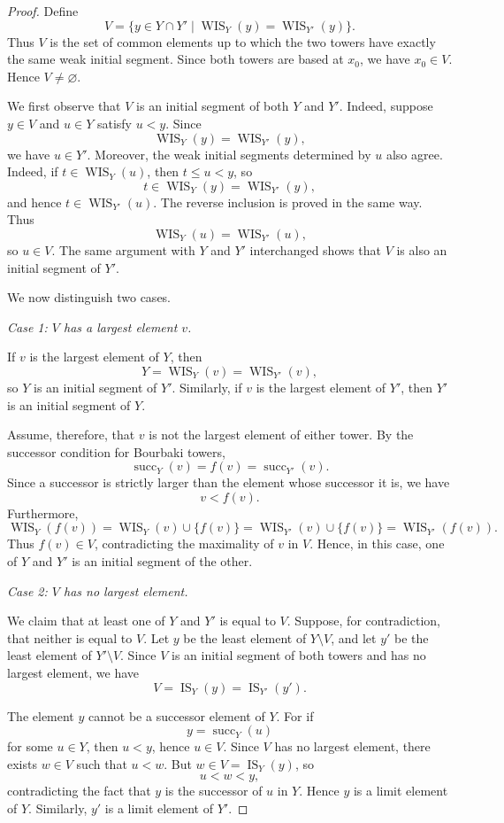 \documentclass[11pt]{article}
\theoremstyle{definition}
\theoremstyle{remark}
\newcommand{\IS}{\operatorname{IS}}
\newcommand{\WIS}{\operatorname{WIS}}
\newcommand{\succop}{\operatorname{succ}}
\begin{document}
\begin{proof}
Define
\[
V=\{y\in Y\cap Y'\mid \WIS_Y(y)=\WIS_{Y'}(y)\}.
\]
Thus \(V\) is the set of common elements up to which the two towers have exactly the
same weak initial segment. Since both towers are based at \(x_0\), we have \(x_0\in V\).
Hence \(V\neq\varnothing\).

We first observe that \(V\) is an initial segment of both \(Y\) and \(Y'\). Indeed, suppose
\(y\in V\) and \(u\in Y\) satisfy \(u<y\). Since
\[
\WIS_Y(y)=\WIS_{Y'}(y),
\]
we have \(u\in Y'\). Moreover, the weak initial segments determined by \(u\) also agree.
Indeed, if \(t\in\WIS_Y(u)\), then \(t\leq u<y\), so
\[
t\in\WIS_Y(y)=\WIS_{Y'}(y),
\]
and hence \(t\in\WIS_{Y'}(u)\). The reverse inclusion is proved in the same way. Thus
\[
\WIS_Y(u)=\WIS_{Y'}(u),
\]
so \(u\in V\). The same argument with \(Y\) and \(Y'\) interchanged shows that \(V\) is
also an initial segment of \(Y'\).

We now distinguish two cases.

\medskip

\noindent
\emph{Case 1: \(V\) has a largest element \(v\).}

If \(v\) is the largest element of \(Y\), then
\[
Y=\WIS_Y(v)=\WIS_{Y'}(v),
\]
so \(Y\) is an initial segment of \(Y'\). Similarly, if \(v\) is the largest element of
\(Y'\), then \(Y'\) is an initial segment of \(Y\).

Assume, therefore, that \(v\) is not the largest element of either tower. By the successor
condition for Bourbaki towers,
\[
\succop_Y(v)=f(v)=\succop_{Y'}(v).
\]
Since a successor is strictly larger than the element whose successor it is, we have
\[
v<f(v).
\]
Furthermore,
\[
\WIS_Y(f(v))
=
\WIS_Y(v)\cup\{f(v)\}
=
\WIS_{Y'}(v)\cup\{f(v)\}
=
\WIS_{Y'}(f(v)).
\]
Thus \(f(v)\in V\), contradicting the maximality of \(v\) in \(V\). Hence, in this case,
one of \(Y\) and \(Y'\) is an initial segment of the other.

\medskip

\noindent
\emph{Case 2: \(V\) has no largest element.}

We claim that at least one of \(Y\) and \(Y'\) is equal to \(V\). Suppose, for
contradiction, that neither is equal to \(V\). Let \(y\) be the least element of
\(Y\setminus V\), and let \(y'\) be the least element of \(Y'\setminus V\). Since \(V\) is
an initial segment of both towers and has no largest element, we have
\[
V=\IS_Y(y)=\IS_{Y'}(y').
\]

The element \(y\) cannot be a successor element of \(Y\). For if
\[
y=\succop_Y(u)
\]
for some \(u\in Y\), then \(u<y\), hence \(u\in V\). Since \(V\) has no largest element,
there exists \(w\in V\) such that \(u<w\). But \(w\in V=\IS_Y(y)\), so
\[
u<w<y,
\]
contradicting the fact that \(y\) is the successor of \(u\) in \(Y\). Hence \(y\) is a
limit element of \(Y\). Similarly, \(y'\) is a limit element of \(Y'\).


\end{proof}
\end{document}
